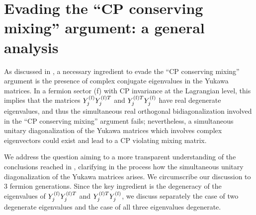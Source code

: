 \documentclass[12pt,a4paper]{article}
\begin{document}
\section{Evading the ``CP conserving mixing'' argument: a general analysis\label{SEC:Gen}}
As discussed in \cite{Gronau:1987xz}, a necessary ingredient to evade the ``CP conserving mixing'' argument is the presence of complex conjugate eigenvalues in the Yukawa matrices. In a fermion sector (f) with CP invariance at the Lagrangian level, this implies that the matrices $Y_{j}^{\rm (f)}Y_{j}^{{\rm (f)}T}$ and $Y_{j}^{{\rm (f)}T}Y_{j}^{\rm (f)}$ have real degenerate eigenvalues, and thus the simultaneous real orthogonal bidiagonalization involved in the ``CP conserving mixing'' argument fails; nevertheless, a simultaneous unitary diagonalization of the Yukawa matrices which involves complex eigenvectors could exist and lead to a CP violating mixing matrix.

We address the question aiming to a more transparent understanding of the conclusions reached in \cite{Gronau:1987xz}, clarifying in the process how the simultaneous unitary diagonalization of the Yukawa matrices arises. We circumscribe our discussion to 3 fermion generations. Since the key ingredient is the degeneracy of the eigenvalues of $Y_{j}^{\rm (f)}Y_{j}^{{\rm (f)}T}$ and $Y_{j}^{{\rm (f)}T}Y_{j}^{\rm (f)}$, we discuss separately the case of two degenerate eigenvalues and the case of all three eigenvalues degenerate.
\end{document}
